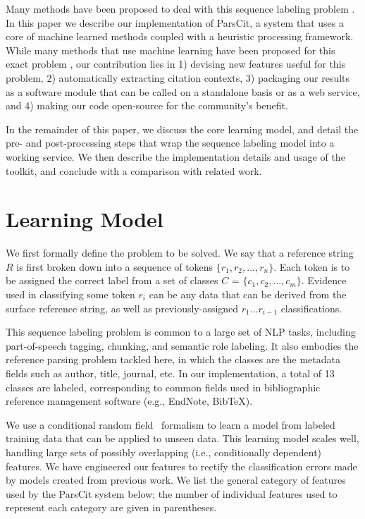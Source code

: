 \documentclass[10pt, a4paper]{article}
\begin{document}
Many methods have been proposed to deal with this sequence labeling
problem \cite{peng04accurate,276685}.  In this paper we describe our
implementation of ParsCit, a system that uses a core of machine
learned methods coupled with a heuristic processing framework.  While
many methods that use machine learning have been proposed for this
exact problem \cite{huang04:_extrac_citat_metad_onlin_public,1255219},
our contribution lies in 1) devising new features useful for this
problem, 2) automatically extracting citation contexts, 3) packaging
our results as a software module that can be called on a standalone
basis or as a web service, and 4) making our code open-source for the
community's benefit.

In the remainder of this paper, we discuss the core learning model,
and detail the pre- and post-processing steps that wrap the sequence
labeling model into a working service.  We then describe the
implementation details and usage of the toolkit, and conclude with a
comparison with related work.

\section{Learning Model}

We first formally define the problem to be solved. We say that a
reference string $R$ is first broken down into a sequence of tokens
$\{r_1, r_2, ..., r_n\}$.  Each token is to be assigned the correct
label from a set of classes $C$ = $\{c_1, c_2, ..., c_m\}$.  Evidence used
in classifying some token $r_i$ can be any data that can be derived
from the surface reference string, as well as previously-assigned $r_1
... r_{i-1}$ classifications.

This sequence labeling problem is common to a large set of NLP tasks,
including part-of-speech tagging, chunking, and semantic role
labeling.  It also embodies the reference parsing problem tackled
here, in which the classes are the metadata fields such as author,
title, journal, etc.  In our implementation, a total of 13 classes are
labeled, corresponding to common fields used in bibliographic reference
management software (e.g., EndNote, BibTeX).

We use a conditional random field~\cite{655813} formalism to learn a model
from labeled training data that can be applied to unseen data.  This
learning model scales well, handling large sets of possibly
overlapping (i.e., conditionally dependent) features.  We have
engineered our features to rectify the classification errors made by
models created from previous work.  We list the general category of
features used by the ParsCit system below; the number of individual
features used to represent each category are given in parentheses.
\end{document}
